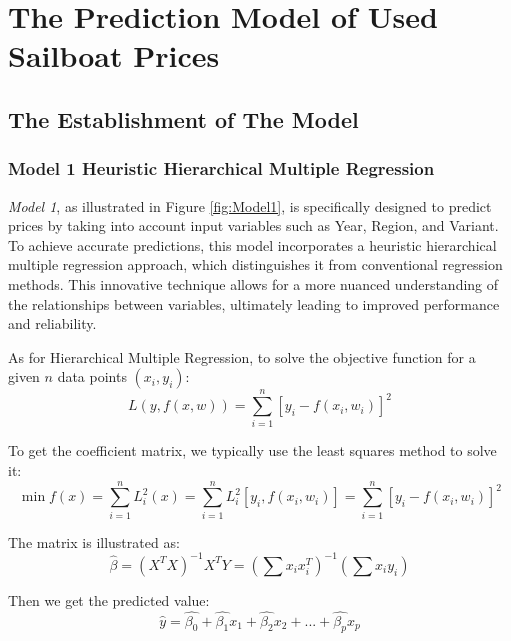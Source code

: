 \documentclass[12pt]{article}  %
\begin{document}
\section{The Prediction Model of Used Sailboat Prices}

\subsection{The Establishment of The Model}
\subsubsection{Model 1 \textemdash  Heuristic Hierarchical Multiple Regression}

\emph{Model 1}, as illustrated in Figure \ref{fig:Model1}, is specifically designed to predict prices by taking into account input variables such as Year, Region, and Variant. To achieve accurate predictions, this model incorporates a heuristic hierarchical multiple regression approach, which distinguishes it from conventional regression methods. This innovative technique allows for a more nuanced understanding of the relationships between variables, ultimately leading to improved performance and reliability.

As for Hierarchical Multiple Regression, to solve the objective function for a given $n$ data points $(x_i, y_i)$:
$$L(y,f(x,w))=\sum_{i=1}^{n}[y_i-f(x_i,w_i)]^2$$

To get the coefficient matrix, we typically use the least squares method to solve it:
$$\min f(x)=\sum_{i=1}^{n}L^2_i(x)=\sum_{i=1}^{n}L_i^2[y_i,f(x_i,w_i)]=\sum_{i=1}^{n}[y_i-f(x_i,w_i)]^2$$

The matrix is illustrated as:
$$\hat{\beta}=(X^TX)^{-1}X^TY=(\sum x_ix_i^T)^{-1}(\sum x_iy_i)$$

Then we get the predicted value:
$$\hat{y} = \hat{\beta_0} + \hat{\beta_1} x_1 + \hat{\beta_2} x_2 + ... + \hat{\beta_p} x_p$$
\end{document}

